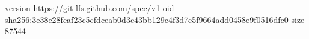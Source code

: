 version https://git-lfs.github.com/spec/v1
oid sha256:3e38e28feaf23c5cfdceab0d3c43bb129c4f3d7e5f9664add0458e9f0516dfc0
size 87544
